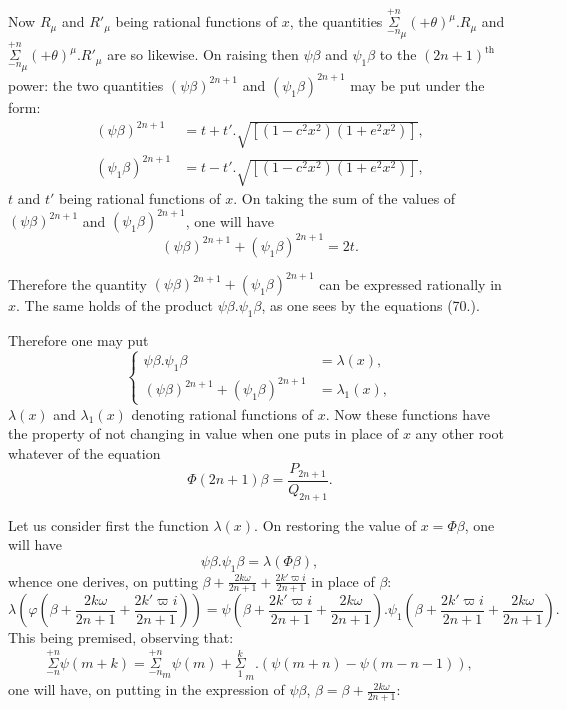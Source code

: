\documentclass{article}
\begin{document}
Now $R_{\mu}$ and $R'_{\mu}$ being rational functions of $x$, the quantities $\overset{+n}{\underset{-n}{\Sigma}}_{\mu}(+\theta)^{\mu}.R_{\mu}$ and $\overset{+n}{\underset{-n}{\Sigma}}_{\mu}(+\theta)^{\mu}.R'_{\mu}$ are so likewise. On raising then $\psi\beta$ and $\psi_{1}\beta$ to the $(2n+1)^{\text{th}}$ power: the two quantities $(\psi\beta)^{2n+1}$ and $(\psi_{1}\beta)^{2n+1}$ may be put under the form:
\[ \begin{aligned}
(\psi\beta)^{2n+1}&=t+t'.\sqrt{[(1-c^{2}x^{2})(1+e^{2}x^{2})]},\\
(\psi_{1}\beta)^{2n+1}&=t-t'.\sqrt{[(1-c^{2}x^{2})(1+e^{2}x^{2})]},
\end{aligned} \]
$t$ and $t'$ being rational functions of $x$. On taking the sum of the values of $(\psi\beta)^{2n+1}$ and $(\psi_{1}\beta)^{2n+1}$, one will have
\[ (\psi\beta)^{2n+1}+(\psi_{1}\beta)^{2n+1}=2t. \]

Therefore the quantity $(\psi\beta)^{2n+1}+(\psi_{1}\beta)^{2n+1}$ can be expressed rationally in $x$. The same holds of the product $\psi\beta.\psi_{1}\beta$, as one sees by the equations (70.).

Therefore one may put
\[ \left\{\begin{aligned}
\psi\beta.\psi_{1}\beta&=\lambda(x),\\
(\psi\beta)^{2n+1}+(\psi_{1}\beta)^{2n+1}&=\lambda_{1}(x),
\end{aligned}\right. \tag{71.} \]
$\lambda(x)$ and $\lambda_{1}(x)$ denoting rational functions of $x$. Now these functions have the property of not changing in value when one puts in place of $x$ any other root whatever of the equation
\[ \Phi(2n+1)\beta=\frac{P_{2n+1}}{Q_{2n+1}}. \]

Let us consider first the function $\lambda(x)$. On restoring the value of $x=\Phi\beta$, one will have
\[ \psi\beta.\psi_{1}\beta=\lambda(\Phi\beta), \]
whence one derives, on putting $\beta+\frac{2k\omega}{2n+1}+\frac{2k'\varpi i}{2n+1}$ in place of $\beta$:
\[ \lambda\left(\varphi\left(\beta+\frac{2k\omega}{2n+1}+\frac{2k'\varpi i}{2n+1}\right)\right)=\psi\left(\beta+\frac{2k'\varpi i}{2n+1}+\frac{2k\omega}{2n+1}\right).\psi_{1}\left(\beta+\frac{2k'\varpi i}{2n+1}+\frac{2k\omega}{2n+1}\right). \]
This being premised, observing that:
\[ \overset{+n}{\underset{-n}{\Sigma}}\psi(m+k)=\overset{+n}{\underset{-n}{\Sigma}}_{m}\psi(m)+\overset{k}{\underset{1}{\Sigma}}_{m}.(\psi(m+n)-\psi(m-n-1)), \tag{72.} \]
one will have, on putting in the expression of $\psi\beta$, $\beta=\beta+\frac{2k\omega}{2n+1}$:
\end{document}
